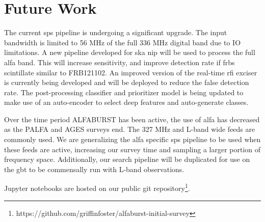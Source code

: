 \documentclass[a4paper,fleqn,usenatbib]{mnras}
\begin{document}

\section{Future Work}
\label{sec:future_work}


The current \gls*{sps} pipeline is undergoing a significant upgrade. The input
bandwidth is limited to 56 MHz of the full 336 MHz digital band due to IO
limitations. A new pipeline developed for \gls*{ska} \gls*{nip} will be used to
process the full \gls*{alfa} band. This will increase sensitivity, and improve
detection rate if \glspl*{frb} scintillate similar to FRB121102. An improved
version of the real-time \gls*{rfi} exciser is currently being developed and
will be deployed to reduce the false detection rate. The post-processing
classifier and prioritizer model is being updated to make use of an auto-encoder
to select deep features and auto-generate classes.

Over the time period ALFABURST has been active, the use of \gls*{alfa} has
decreased as the PALFA and AGES surveys end. The 327 MHz and L-band wide feeds
are commonly used. We are generalizing the \gls*{alfa} specific \gls*{sps}
pipeline to be used when these feeds are active, increasing our survey time and
sampling a larger portion of frequency space. Additionally, our search pipeline
will be duplicated for use on the \gls*{gbt} to be commensally run with L-band
observations. 

Jupyter notebooks are hosted on our public git
repository\footnote{https://github.com/griffinfoster/alfaburst-initial-survey}.


 

\bsp	%
\label{lastpage}
\end{document}
